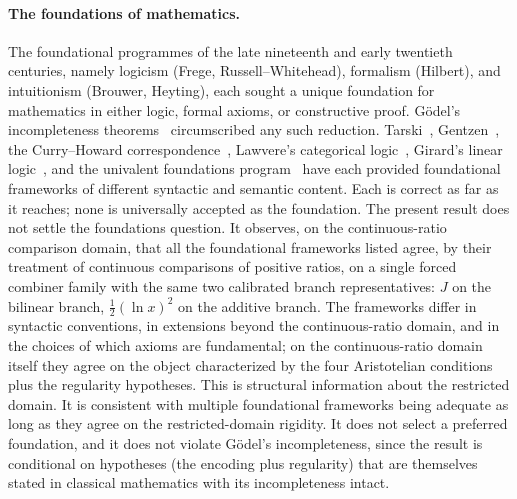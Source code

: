 \documentclass[11pt,a4paper]{article}
\theoremstyle{definition}
\theoremstyle{remark}
\begin{document}
\paragraph{The foundations of mathematics.}
The foundational programmes of the late nineteenth and early twentieth
centuries, namely logicism (Frege, Russell--Whitehead), formalism
(Hilbert), and intuitionism (Brouwer, Heyting), each sought a unique
foundation for mathematics in either logic, formal axioms, or
constructive proof. G\"odel's incompleteness
theorems~\cite{Goedel1931} circumscribed any such reduction.
Tarski~\cite{Tarski1933}, Gentzen~\cite{Gentzen1935}, the Curry--Howard
correspondence~\cite{Curry1934, Howard1969}, Lawvere's
categorical logic~\cite{Lawvere1964}, Girard's linear
logic~\cite{Girard1987}, and the univalent foundations
program~\cite{HoTT2013} have each provided foundational frameworks of
different syntactic and semantic content. Each is correct as far as it
reaches; none is universally accepted as the foundation. The present
result does not settle the foundations question. It observes, on the
continuous-ratio comparison domain, that all the foundational
frameworks listed agree, by their treatment of continuous comparisons
of positive ratios, on a single forced combiner family with the same
two calibrated branch representatives: $J$ on the bilinear branch,
$\tfrac{1}{2}(\ln x)^2$ on the additive branch. The
frameworks differ in syntactic conventions, in extensions beyond the
continuous-ratio domain, and in the choices of which axioms are
fundamental; on the continuous-ratio domain itself they agree on the
object characterized by the four Aristotelian conditions plus the
regularity hypotheses. This is structural information about the
restricted domain. It is consistent with multiple foundational
frameworks being adequate as long as they agree on the restricted-domain
rigidity. It does not select a preferred foundation, and it does not
violate G\"odel's incompleteness, since the result is conditional on
hypotheses (the encoding plus regularity) that are themselves stated in
classical mathematics with its incompleteness intact.
\end{document}
